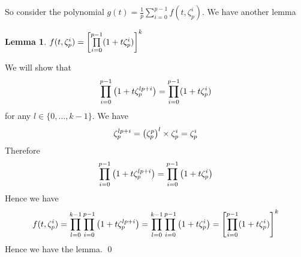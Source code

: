 \documentclass[a4paper, 11pt]{article}
\newtheorem{lemma}{Lemma}
\renewenvironment{proof}{\noindent{\it \textbf{Proof:}}\hspace*{1em}}{\hfill\qed\bigskip\\}
\begin{document}
{So consider the polynomial $g(t)=\frac1p\sum\limits_{i=0}^{p-1}f(t,\zeta_p^i)$. We have another lemma
\begin{lemma}\label{lem42}
	$f(t,\zeta_p^i)=\left[ \prod\limits_{i=0}^{p-1}(1+t\zeta_p^i)\right]^k$
\end{lemma}
\begin{proof}
	We will show that $$\prod\limits_{i=0}^{p-1}\left(1+t\zeta_p^{lp+i}\right)= \prod\limits_{i=0}^{p-1}(1+t\zeta_p^i)$$ for any $l\in \{0,\dots, k-1\}$. We have $$\zeta_p^{lp+i}=\left(\zeta_p^{p}\right)^l\times \zeta_p^i=\zeta_p^i$$Therefore $$\prod\limits_{i=0}^{p-1}\left(1+t\zeta_p^{lp+i}\right)=\prod\limits_{i=0}^{p-1}\left(1+t\zeta_p^{i}\right)$$Hence we have $$f(t,\zeta_p^i)=\prod_{l=0}^{k-1}\prod\limits_{i=0}^{p-1}\left(1+t\zeta_p^{lp+i}\right)=\prod_{l=0}^{k-1}\prod\limits_{i=0}^{p-1}\left(1+t\zeta_p^{i}\right)=\left[ \prod\limits_{i=0}^{p-1}(1+t\zeta_p^i)\right]^k$$Hence we have the lemma.
\end{proof}

}
\end{document}
